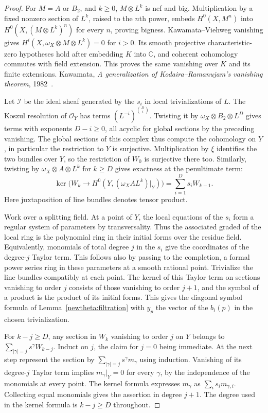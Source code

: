 \begin{proof}
For \(M=A\) or \(B_2\), and \(k\ge0\), \(M\otimes L^k\) is nef and
big. Multiplication by a fixed nonzero section of \(L^k\), raised to
the \(n\)th power, embeds \(H^0(X,M^n)\) into
\(H^0(X,(M\otimes L^k)^n)\) for every \(n\), proving bigness.
Kawamata--Viehweg vanishing gives
\(H^i(X,\omega_X\otimes M\otimes L^k)=0\) for \(i>0\). Its smooth
projective characteristic-zero hypotheses hold after embedding \(K\)
into \(\mathbb C\), and coherent cohomology commutes with field extension.
This proves the same vanishing over \(K\) and its finite extensions.
Kawamata, \emph{A generalization of Kodaira--Ramanujam's vanishing theorem}, 1982~\cite{kawamataVanishing}.

Let \(\mathcal I\) be the ideal sheaf generated by the \(s_i\) in
local trivializations of \(L\). The Koszul resolution of
\(\mathcal O_Y\) has terms \((L^{-i})^{\binom Di}\). Twisting it by
\(\omega_X\otimes B_2\otimes L^D\) gives terms with exponents
\(D-i\ge0\), all acyclic for global sections by the preceding
vanishing. The global sections of this complex thus compute the
cohomology on \(Y\), in particular the restriction to \(Y\) is
surjective. Multiplication by \(\xi\) identifies the two bundles
over \(Y\), so the restriction of \(W_0\) is surjective there too.
Similarly, twisting by \(\omega_X\otimes A\otimes L^k\) for \(k\ge D\)
gives exactness at the penultimate term:
\[
 \ker\big(W_k\longrightarrow H^0(Y,(\omega_X A L^k)|_Y)\big)
           =\sum_{i=1}^{D}s_i W_{k-1}.
\]
Here juxtaposition of line bundles denotes tensor product.

Work over a splitting field. At a point of \(Y\), the local equations
of the \(s_i\) form a regular system of parameters by transversality.
Thus the associated graded of the local ring is the polynomial ring
in their initial forms over the residue field. Equivalently, monomials
of total degree \(j\) in the \(s_i\) give the coordinates of the
degree-\(j\) Taylor term. This follows also by passing to the completion,
a formal power series ring in these parameters at a smooth rational
point. Trivialize the line bundles compatibly at each point. The kernel
of this Taylor term on sections vanishing to order \(j\) consists of
those vanishing to order \(j+1\), and the symbol of a product is the
product of its initial forms. This gives the diagonal symbol formula
of Lemma~\ref{newtheta:filtration} with \(y_p\) the vector
of the \(b_i(p)\) in the chosen trivialization.

For \(k-j\ge D\), any section in \(W_k\) vanishing to order \(j\)
on \(Y\) belongs to \(\sum_{|\gamma|=j}s^\gamma W_{k-j}\).
Induct on \(j\), the claim for \(j=0\) being immediate. At the next
step represent the section by
\(\sum_{|\gamma|=j}s^\gamma m_\gamma\) using induction. Vanishing
of its degree-\(j\) Taylor term implies \(m_\gamma|_Y=0\) for
every \(\gamma\), by the independence of the monomials at every
point. The kernel formula expresses \(m_\gamma\) as
\(\sum_i s_i m_{\gamma,i}\). Collecting equal monomials gives the
assertion in degree \(j+1\). The degree used in the kernel formula
is \(k-j\ge D\) throughout.


\end{proof}
